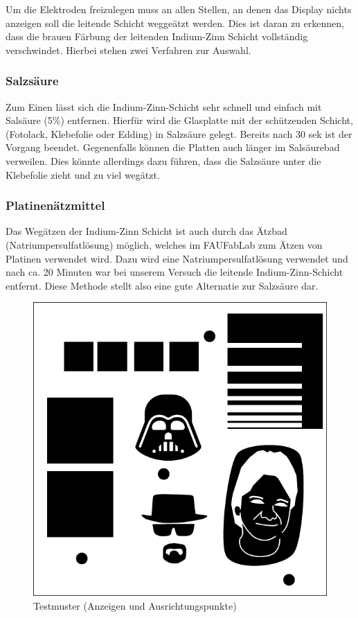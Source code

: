 Um die Elektroden freizulegen muss an allen Stellen, an denen das Display nichts anzeigen soll die leitende Schicht weggeätzt werden. Dies ist daran zu erkennen, dass die brauen Färbung der leitenden Indium-Zinn Schicht vollständig verschwindet. Hierbei stehen zwei Verfahren zur Auswahl.\\

\subsubsection*{Salzsäure}

Zum Einen lässt sich die Indium-Zinn-Schicht sehr schnell und einfach mit Salsäure (5\%) entfernen. Hierfür wird die Glasplatte mit der schützenden Schicht, (Fotolack, Klebefolie oder Edding) in Salzsäure gelegt. Bereits nach 30 sek ist der Vorgang beendet. Gegenenfalls können die Platten auch länger im Salsäurebad verweilen. Dies könnte allerdings dazu führen, dass die Salzsäure unter die Klebefolie zieht und zu viel wegätzt.

\subsubsection*{Platinenätzmittel}
Das Wegätzen der Indium-Zinn Schicht ist auch durch das Ätzbad (Natriumpersulfatlösung) möglich, welches im FAUFabLab zum Ätzen von Platinen verwendet wird. Dazu wird eine Natriumpersulfatlösung verwendet und nach ca. 20 Minuten war bei unserem Versuch die leitende Indium-Zinn-Schicht entfernt. Diese Methode stellt also eine gute Alternatie zur Salzsäure dar.

\begin{figure}[t]
  \centering
  \includegraphics[width=0.5\linewidth, keepaspectratio]{Bilder/testmuster}
  \caption{Testmuster (Anzeigen und Ausrichtungspunkte)}
  \label{testmuster}
\end{figure}


